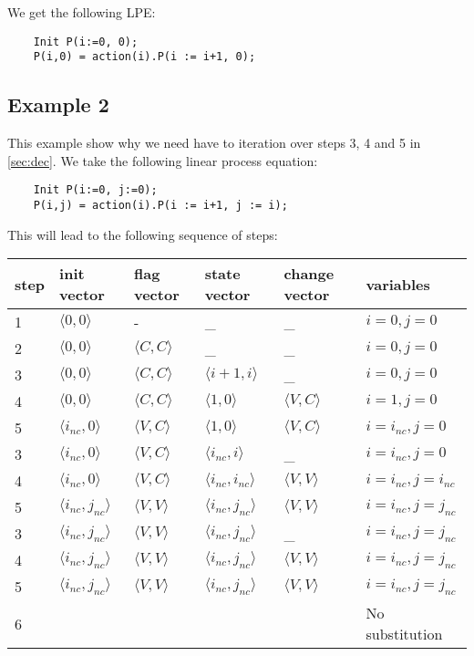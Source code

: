 \documentclass[a4paper,9pt]{article}
\begin{document}
We get the following LPE:
\begin{verbatim}
    Init P(i:=0, 0);
    P(i,0) = action(i).P(i := i+1, 0); 
\end{verbatim}

\subsection{Example 2}
This example show why we need have to iteration over steps 3, 4 and 5 in \ref{sec:dec}. We take the following linear process equation:
\begin{verbatim}
    Init P(i:=0, j:=0);
    P(i,j) = action(i).P(i := i+1, j := i); 
\end{verbatim} %
This will lead to the following sequence of steps:\\
\begin{tabular}{|l|l|l|l|l|l|}
\hline
step 	&  init vector & flag vector& state vector & change vector & variables \\
\hline
\hline
1	&  $\langle 0,0 \rangle$  		& -				& \_					& \_				& $i=0, j=0 $ \\
\hline
2	&  $\langle 0,0 \rangle$  		&  $\langle C,C \rangle$  	& \_					& \_				& $i=0, j=0 $\\
\hline
3	&  $\langle 0,0 \rangle$  		&  $\langle C,C \rangle$  	&  $\langle i+1,i \rangle$ 		& \_				& $i=0, j=0 $\\
\hline
4	&  $\langle 0,0 \rangle$ 		&  $\langle C,C \rangle$ 	&  $\langle 1,0 \rangle$  		&  $\langle V,C \rangle$ 	& $i=1, j=0 $\\
\hline
5	&  $\langle i_{nc},0 \rangle$ 		&  $\langle V,C \rangle$ 	&  $\langle 1,0 \rangle$  		&  $\langle V,C \rangle$ 	& $i= i_{nc} , j=0$ \\
\hline
3	&  $\langle   i_{nc} ,0 \rangle$  		&  $\langle V,C \rangle$ 	&  $\langle   i_{nc} ,i  \rangle$  		&  \_			  	& $i= i_{nc} , j=0$ \\
\hline
4	&  $\langle   i_{nc} ,0 \rangle$  		&  $\langle V,C \rangle$  	&  $\langle   i_{nc} , i_{nc}   \rangle$  	&  $\langle V,V \rangle$  	& $i= i_{nc} , j= i_{nc}  $\\
\hline
5	&  $\langle   i_{nc} ,j_{nc} \rangle$  		&  $\langle V,V \rangle$  	&  $\langle   i_{nc} , j_{nc}   \rangle$  	&  $\langle V,V \rangle$  	& $i= i_{nc} , j= j_{nc}  $\\
\hline
3 	&  $\langle   i_{nc} , j_{nc}   \rangle$  	&  $\langle V,V \rangle$ 	&  $\langle   i_{nc} , j_{nc}   \rangle$  	&  \_			  	& $i= i_{nc} , j= j_{nc}  $\\
\hline
4	&  $\langle   i_{nc} , j_{nc}   \rangle$  	&  $\langle V,V \rangle$  	&  $\langle   i_{nc} , j_{nc}   \rangle$  	&  $\langle V,V \rangle$  	& $i= i_{nc} , j= j_{nc} $ \\
\hline
5	&  $\langle   i_{nc} , j_{nc}   \rangle$  	&  $\langle V,V \rangle$  	&  $\langle   i_{nc} , j_{nc}   \rangle$  	&  $\langle V,V \rangle$  	& $i= i_{nc} , j= j_{nc} $ \\
\hline
6 	& 			 		& 				& 					&				& No substitution\\
\hline
\end{tabular} \\
\end{document}
